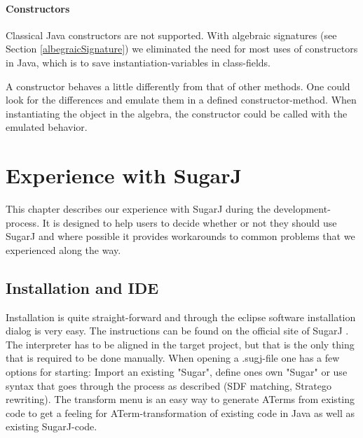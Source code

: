 \documentclass{report}
\begin{document}
\subsubsection*{Constructors}

Classical Java constructors are not supported. With algebraic signatures (see Section \ref{albegraicSignature}) we eliminated the need for most uses of constructors in Java, which is to save instantiation-variables in class-fields.

A constructor behaves a little differently from that of other methods. One could look for the differences and emulate them in a defined constructor-method. When instantiating the object in the algebra, the constructor could be called with the emulated behavior.


\chapter{Experience with SugarJ}
\label{sugarJChapter}

This chapter describes our experience with SugarJ during the development-process. It is designed to help users to decide whether or not they should use SugarJ and where possible it provides workarounds to common problems that we experienced along the way.

\section{Installation and IDE}
Installation is quite straight-forward and through the eclipse software installation dialog is very easy. The instructions can be found on the official site of SugarJ \cite{SugarJ-Homepage}. The interpreter has to be aligned in the target project, but that is the only thing that is required to be done manually. When opening a .sugj-file one has a few options for starting: Import an existing "Sugar", define ones own "Sugar" or use syntax that goes through the process as described (SDF matching, Stratego rewriting). The transform menu is an easy way to generate ATerms from existing code to get a feeling for ATerm-transformation of existing code in Java as well as existing SugarJ-code.
\end{document}
